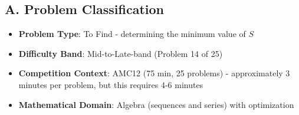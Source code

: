 \documentclass[12pt]{article}
\begin{document}
\begin{problemconfigbox}
\subsection*{A. Problem Classification}
\begin{itemize}[leftmargin=*]
    \item \textbf{Problem Type}: To Find - determining the minimum value of $S$
    \item \textbf{Difficulty Band}: Mid-to-Late-band (Problem 14 of 25)
    \item \textbf{Competition Context}: AMC12 (75 min, 25 problems) - approximately 3 minutes per problem, but this requires 4-6 minutes
    \item \textbf{Mathematical Domain}: Algebra (sequences and series) with optimization
\end{itemize}


\end{problemconfigbox}
\end{document}

